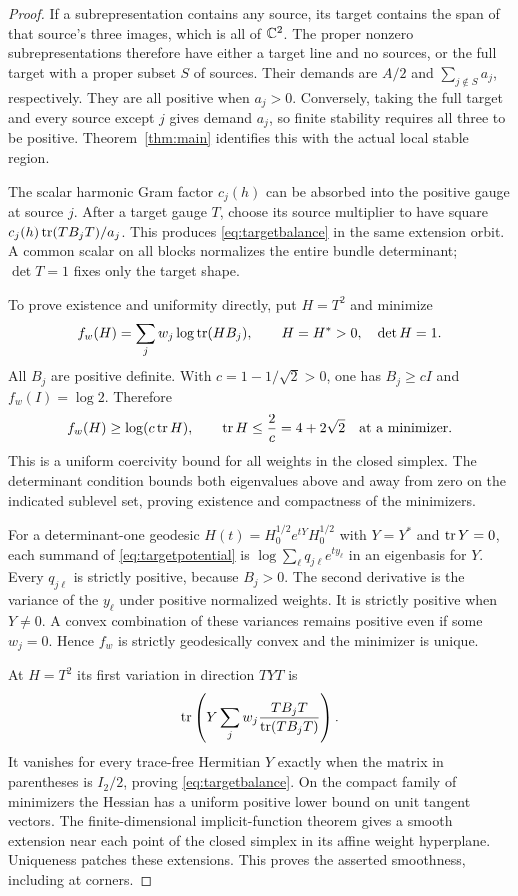 \begin{proof}
If a subrepresentation contains any source, its target contains
the span of that source's three images, which is all of $\mathbb C^2$.
The proper nonzero subrepresentations therefore have either a
target line and no sources, or the full target with a proper
subset $S$ of sources. Their demands are $A/2$ and
$\sum_{j\notin S}a_j$, respectively. They are all positive
when $a_j>0$. Conversely, taking the full target and every
source except $j$ gives demand $a_j$, so finite stability
requires all three to be positive. Theorem~\ref{thm:main}
identifies this with the actual local stable region.

The scalar harmonic Gram factor $c_j(h)$ can be absorbed into
the positive gauge at source $j$. After a target gauge $T$,
choose its source multiplier to have square
$c_j(h)\operatorname{tr}(TB_jT)/a_j$. This produces \eqref{eq:targetbalance}
in the same extension orbit. A common scalar on all blocks
normalizes the entire bundle determinant; $\det T=1$ fixes only
the target shape.

To prove existence and uniformity directly, put $H=T^2$ and
minimize
\begin{equation}\label{eq:targetpotential}
f_w(H)=\sum_jw_j\log\operatorname{tr}(HB_j),\qquad H=H^*>0,\quad\det H=1.
\end{equation}
All $B_j$ are positive definite. With $c=1-1/\sqrt2>0$,
one has $B_j\ge cI$ and $f_w(I)=\log2$. Therefore
\[
f_w(H)\ge\log(c\operatorname{tr} H),\qquad
\operatorname{tr} H\le\frac2c=4+2\sqrt2
\quad\text{at a minimizer}.
\]
This is a uniform coercivity bound for all weights in the
closed simplex. The determinant condition bounds both
eigenvalues above and away from zero on the indicated sublevel
set, proving existence and compactness of the minimizers.

For a determinant-one geodesic
$H(t)=H_0^{1/2}e^{tY}H_0^{1/2}$ with $Y=Y^*$ and $\operatorname{tr} Y=0$,
each summand of \eqref{eq:targetpotential} is
$\log\sum_\ell q_{j\ell}e^{ty_\ell}$ in an eigenbasis for $Y$.
Every $q_{j\ell}$ is strictly positive, because $B_j>0$.
The second derivative is the variance of the $y_\ell$ under
positive normalized weights. It is strictly positive when
$Y\ne0$. A convex combination of these variances remains
positive even if some $w_j=0$. Hence $f_w$ is strictly geodesically
convex and the minimizer is unique.

At $H=T^2$ its first variation in direction $TYT$ is
\[
\operatorname{tr}\left(Y\sum_jw_j\frac{TB_jT}{\operatorname{tr}(TB_jT)}\right).
\]
It vanishes for every trace-free Hermitian $Y$ exactly when the
matrix in parentheses is $I_2/2$, proving
\eqref{eq:targetbalance}. On the compact family of minimizers
the Hessian has a uniform positive lower bound on unit tangent
vectors. The finite-dimensional implicit-function theorem gives
a smooth extension near each point of the closed simplex in its
affine weight hyperplane. Uniqueness patches these extensions.
This proves the asserted smoothness, including at corners.
\end{proof}


